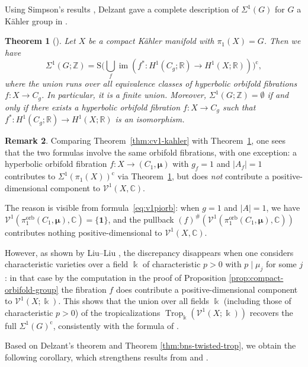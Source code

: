 \documentclass[11pt]{amsart}
\newtheorem{theorem}{Theorem}[section]
\theoremstyle{definition}
\newtheorem{remark}[theorem]{Remark}
\newcommand{\Z}{\mathbb{Z}}
\newcommand{\R}{\mathbb{R}}
\newcommand{\C}{\mathbb{C}}
\newcommand{\bo}{\mathbf{1}}
\renewcommand{\k}{\Bbbk}
\newcommand{\VV}{\mathcal{V}}
\newcommand{\rS}{\mathrm{S}}
\DeclareMathOperator{\im}{im}
\DeclareMathOperator{\Trop}{Trop}
\DeclareMathOperator{\orb}{orb}
\newcommand{\compl}{\mathrm{c}}
\newcommand{\abs}[1]{\left| #1 \right|}
\begin{document}
Using Simpson's results \cite[Thm.~1]{Sim}, Delzant gave a complete 
description of $\Sigma^1(G)$ for $G$ a K\"ahler group in \cite[Thm.~1.1]{De10}. 

\begin{theorem}[{\cite[Thm.~1.1]{De10}}] 
\label{thm Delzant} 
Let $X$ be a compact K\"ahler manifold with $\pi_1(X)=G$. Then we have
\[
\Sigma^1(G;\Z) = \rS \bigg(\!\bigcup_f \im(f^{*}\colon 
H^1(C_g;\R)\longrightarrow  H^1(X;\R) ) \bigg)^{\compl},
\]
where the union runs over all equivalence classes of 
hyperbolic orbifold fibrations 
$f\colon X\to C_g$. In particular, it is a finite union. 
Moreover, $\Sigma^1(G;\Z)=\emptyset$ if and only if there exists a 
hyperbolic orbifold fibration $f\colon X \to C_g$ such that 
$f^*\colon H^1(C_g;\R)\to H^1(X;\R)$ is an isomorphism.
\end{theorem}

\begin{remark}
\label{rem:cv1-vs-sigma1}
Comparing Theorem~\ref{thm:cv1-kahler} with 
Theorem~\ref{thm Delzant}, one sees that the two 
formulas involve the same orbifold fibrations, with 
one exception: a hyperbolic orbifold fibration 
$f\colon X\to (C_1,\bm{\mu})$ with $g_f=1$ and 
$\abs{A_f} = 1$  contributes to $\Sigma^1(\pi_1(X))^{\compl}$ 
via Theorem~\ref{thm Delzant}, 
but does \emph{not} contribute a positive-dimensional 
component to $\VV^1(X,\C)$.

The reason is visible from formula~\eqref{eq:v1piorb}: when $g=1$ 
and $\abs{A}=1$, we have  $\VV^1(\pi_1^{\orb}(C_1,\bm{\mu}),\C) = \{\bo\}$, 
and the pullback $(f)^\#(\VV^1(\pi_1^{\orb}(C_1,\bm{\mu}),\C))$ 
contributes nothing positive-dimensional to $\VV^1(X,\C)$.

However, as shown by Liu--Liu \cite{LL}, the discrepancy 
disappears when one considers characteristic varieties 
over a field $\k$ of characteristic $p>0$ with $p\mid \mu_j$ for some $j$: 
in that case by the computation in the proof of Proposition \ref{prop:compact-orbifold-group}
the fibration $f$ does contribute a positive-dimensional 
component to $\VV^1(X;\k)$. 
This shows that the union over all fields $\k$ 
(including those of characteristic $p>0$) 
of the tropicalizations $\Trop_\k(\VV^1(X;\k))$ 
recovers the full $\Sigma^1(G)^{\compl}$, 
consistently with the formula of \cite{LL}.
\end{remark}

Based on Delzant's theorem and Theorem \ref{thm:bns-twisted-trop}, 
we obtain the following corollary, which strengthens results 
from \cite{Su-mathann} and \cite{LL}.
\end{document}
